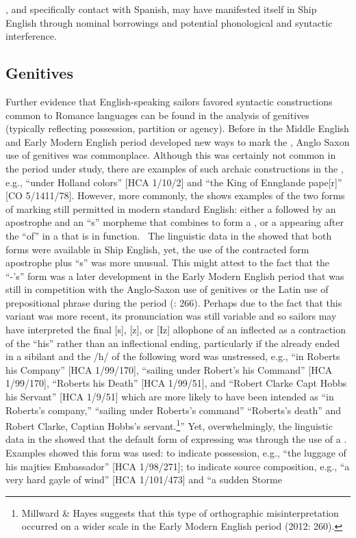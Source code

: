 , and specifically contact with Spanish, may have manifested itself in Ship English through nominal borrowings and potential phonological and syntactic interference. ~

\subsection{{Genitives}}\label{sec:5.2.2}

Further evidence that English-speaking sailors favored syntactic constructions common to Romance languages can be found in the analysis of genitives (typically reflecting possession, partition or agency). Before  in the Middle English and Early Modern English period developed new ways to mark the , Anglo Saxon use of  genitives was commonplace. Although this was certainly not common in the period under study, there are examples of such archaic constructions in the , e.g., “under Holland colors” [HCA 1/10/2] and “the King of Ennglande pape[r]” [CO 5/1411/78]. However, more commonly, the  shows examples of the two forms of  marking still permitted in modern standard English: either a  followed by an apostrophe and an “s” morpheme that combines to form a  , or a  appearing after the  “of” in a  that is  in function. ~The linguistic data in the  showed that both forms were available in Ship English, yet, the use of the contracted form apostrophe plus “s” was more unusual. This might attest to the fact that the “-’s”  form was a later development in the Early Modern English period that was still in competition with the Anglo-Saxon use of  genitives or the Latin use of prepositional  phrase during the period (\citealt{MillwardHayes2012}: 266). Perhaps due to the fact that this variant was more recent, its pronunciation was still variable and so sailors may have interpreted the final [s], [z], or [Iz] allophone of an inflected   as a contraction of the   “his” rather than an inflectional ending, particularly if the  already ended in a sibilant and the /h/ of the following word was unstressed, e.g., “in Roberts his Company” [HCA 1/99/170], “sailing under Robert’s his Command” [HCA 1/99/170], “Roberts his Death” [HCA 1/99/51], and “Robert Clarke Capt Hobbs his Servant” [HCA 1/9/51] which are more likely to have been intended as “in Roberts’s company,” “sailing under Roberts’s command” “Roberts’s death” and Robert Clarke, Captian Hobbs’s servant.\footnote{Millward \& Hayes suggests that this type of orthographic misinterpretation occurred on a wider scale in the Early Modern English period (2012: 260).}” Yet, overwhelmingly, the linguistic data in the  showed that the default form of expressing  was through the use of a . Examples showed this form was used: to indicate possession, e.g., “the luggage of his majties Embassador” [HCA 1/98/271]; to indicate source composition, e.g., “a very hard gayle of wind” [HCA 1/101/473] and “a sudden Storme 